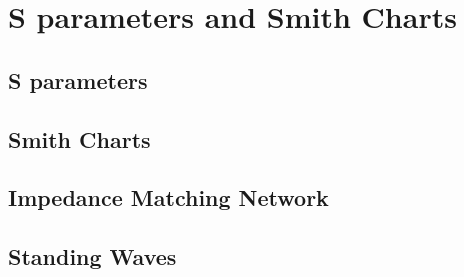 
\section{S parameters and Smith Charts}
\subsection{S parameters}
\subsection{Smith Charts}
\subsection{Impedance Matching Network}
\subsection{Standing Waves}